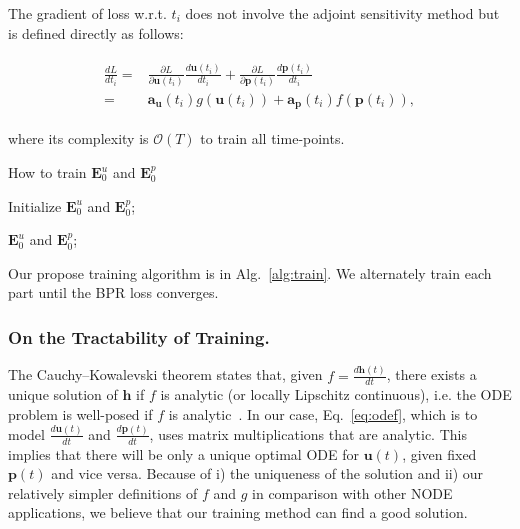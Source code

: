 \documentclass[sigconf]{acmart}
\begin{document}
The gradient of loss w.r.t. $t_i$ does not involve the adjoint sensitivity method but is defined directly as follows:
\begin{linenomath*}\begin{align}\begin{split}
\frac{d L}{d t_i} =& \frac{\partial L}{\partial \bm{u}(t_i)}\frac{d \bm{u}(t_i)}{d t_i} + \frac{\partial L}{\partial \bm{p}(t_i)}\frac{d \bm{p}(t_i)}{d t_i}\\
=& \bm{a}_{\bm{u}}(t_i)g(\bm{u}(t_i)) + \bm{a}_{\bm{p}}(t_i)f(\bm{p}(t_i)),
\end{split}\end{align}\end{linenomath*}where its complexity is $\mathcal{O}(T)$ to train all time-points.


\begin{algorithm}[t]
\SetAlgoLined
\caption{How to train $\bm{E}^u_{0}$ and $\bm{E}^p_{0}$}\label{alg:train}
Initialize $\bm{E}^u_{0}$ and $\bm{E}^p_{0}$;

\Return $\bm{E}^u_{0}$ and $\bm{E}^p_{0}$;
\end{algorithm}

Our propose training algorithm is in Alg.~\ref{alg:train}. We alternately train each part until the BPR loss converges.

\subsubsection{On the Tractability of Training.}\label{sec:well}
The Cauchy--Kowalevski theorem states that, given $f = \frac{d \bm{h}(t)}{d t}$, there exists a unique solution of $\bm{h}$ if $f$ is analytic (or locally Lipschitz continuous), i.e. the ODE problem is well-posed if $f$ is analytic~\cite{10.2307/j.ctvzsmfgn}. In our case, Eq.~\eqref{eq:odef}, which is to model $\frac{d \bm{u}(t)}{d t}$ and $\frac{d \bm{p}(t)}{d t}$, uses matrix multiplications that are analytic. This implies that there will be only a unique optimal ODE for $\bm{u}(t)$, given fixed $\bm{p}(t)$ and vice versa. Because of i) the uniqueness of the solution and ii) our relatively simpler definitions of $f$ and $g$ in comparison with other NODE applications, we believe that our training method can find a good solution.
\end{document}
